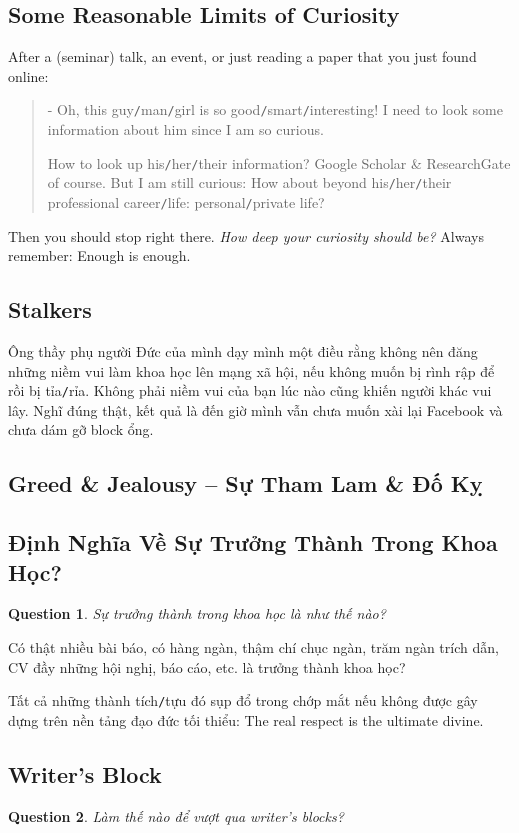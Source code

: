 \documentclass{article}
\numberwithin{equation}{section}
\newtheorem{ques}{Question}[section]
\begin{document}
\subsection{Some Reasonable Limits of Curiosity}
After a (seminar) talk, an event, or just reading a paper that you just found online:
\begin{quotation}
	- Oh, this guy\texttt{/}man\texttt{/}girl is so good\texttt{/}smart\texttt{/}interesting! I need to look some information about him since I am so curious.
	
	How to look up his\texttt{/}her\texttt{/}their information? Google Scholar \& ResearchGate of course. But I am still curious: How about beyond his\texttt{/}her\texttt{/}their professional career\texttt{/}life: personal\texttt{/}private life?
\end{quotation}
Then you should stop right there. \textit{How deep your curiosity should be?} Always remember: Enough is enough.

\subsection{Stalkers}
Ông thầy phụ người Đức của mình dạy mình một điều rằng không nên đăng những niềm vui làm khoa học lên mạng xã hội, nếu không muốn bị rình rập để rồi bị tỉa\texttt{/}rỉa. Không phải niềm vui của bạn lúc nào cũng khiến người khác vui lây. Nghĩ đúng thật, kết quả là đến giờ mình vẫn chưa muốn xài lại Facebook và chưa dám gỡ block ổng.

\subsection{Greed \& Jealousy -- Sự Tham Lam \& Đố Kỵ}

\subsection{Định Nghĩa Về Sự Trưởng Thành Trong Khoa Học?}
\begin{ques}
	Sự trưởng thành trong khoa học là như thế nào?
\end{ques}
Có thật nhiều bài báo, có hàng ngàn, thậm chí chục ngàn, trăm ngàn trích dẫn, CV đầy những hội nghị, báo cáo, etc. là trưởng thành khoa học?

Tất cả những thành tích\texttt{/}tựu đó sụp đổ trong chớp mắt nếu không được gây dựng trên nền tảng đạo đức tối thiểu: The real respect is the ultimate divine.

\subsection{Writer's Block}
\begin{ques}
	Làm thế nào để vượt qua writer's blocks?
\end{ques}
\end{document}

